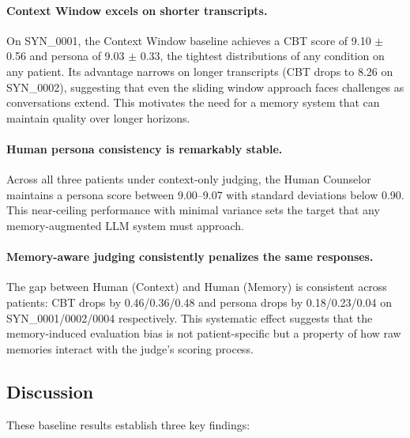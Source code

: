 \paragraph{Context Window excels on shorter transcripts.} On SYN\_0001, the Context Window baseline achieves a CBT score of 9.10 $\pm$ 0.56 and persona of 9.03 $\pm$ 0.33, the tightest distributions of any condition on any patient. Its advantage narrows on longer transcripts (CBT drops to 8.26 on SYN\_0002), suggesting that even the sliding window approach faces challenges as conversations extend. This motivates the need for a memory system that can maintain quality over longer horizons.

\paragraph{Human persona consistency is remarkably stable.} Across all three patients under context-only judging, the Human Counselor maintains a persona score between 9.00--9.07 with standard deviations below 0.90. This near-ceiling performance with minimal variance sets the target that any memory-augmented LLM system must approach.

\paragraph{Memory-aware judging consistently penalizes the same responses.} The gap between Human (Context) and Human (Memory) is consistent across patients: CBT drops by 0.46/0.36/0.48 and persona drops by 0.18/0.23/0.04 on SYN\_0001/0002/0004 respectively. This systematic effect suggests that the memory-induced evaluation bias is not patient-specific but a property of how raw memories interact with the judge's scoring process.

\subsection{Discussion}

These baseline results establish three key findings:

